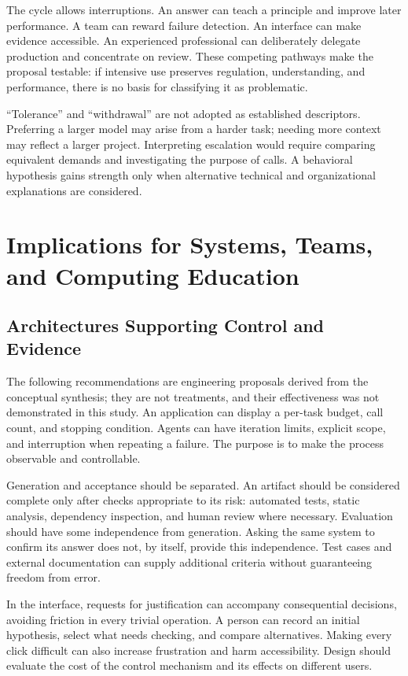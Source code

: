 \documentclass[11pt,a4paper]{article}
\begin{document}
The cycle allows interruptions. An answer can teach a principle and improve later performance. A team can reward failure detection. An interface can make evidence accessible. An experienced professional can deliberately delegate production and concentrate on review. These competing pathways make the proposal testable: if intensive use preserves regulation, understanding, and performance, there is no basis for classifying it as problematic.

``Tolerance'' and ``withdrawal'' are not adopted as established descriptors. Preferring a larger model may arise from a harder task; needing more context may reflect a larger project. Interpreting escalation would require comparing equivalent demands and investigating the purpose of calls. A behavioral hypothesis gains strength only when alternative technical and organizational explanations are considered.

\section{Implications for Systems, Teams, and Computing Education}
\subsection{Architectures Supporting Control and Evidence}
The following recommendations are engineering proposals derived from the conceptual synthesis; they are not treatments, and their effectiveness was not demonstrated in this study. An application can display a per-task budget, call count, and stopping condition. Agents can have iteration limits, explicit scope, and interruption when repeating a failure. The purpose is to make the process observable and controllable.

Generation and acceptance should be separated. An artifact should be considered complete only after checks appropriate to its risk: automated tests, static analysis, dependency inspection, and human review where necessary. Evaluation should have some independence from generation. Asking the same system to confirm its answer does not, by itself, provide this independence. Test cases and external documentation can supply additional criteria without guaranteeing freedom from error.

In the interface, requests for justification can accompany consequential decisions, avoiding friction in every trivial operation. A person can record an initial hypothesis, select what needs checking, and compare alternatives. Making every click difficult can also increase frustration and harm accessibility. Design should evaluate the cost of the control mechanism and its effects on different users.
\end{document}
